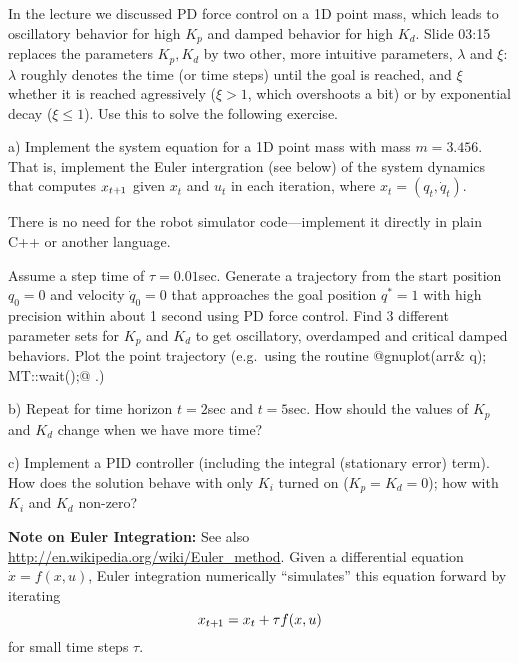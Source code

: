 

\renewcommand{\course}{Robotics}
\renewcommand{\coursepicture}{roboticsLecture}
\renewcommand{\coursedate}{Winter 2014}
\renewcommand{\exnum}{5}

\exercises


\exercisestitle


In the lecture we discussed PD force control on a 1D point mass,
which leads to oscillatory behavior for high $K_p$ and damped behavior
for high $K_d$. Slide 03:15 replaces the parameters
$K_p,K_d$ by two other, more intuitive parameters, $\lambda$ and
$\xi$: $\lambda$ roughly denotes the time (or time steps) until the
goal is reached, and $\xi$ whether it is reached agressively ($\xi>1$,
which overshoots a bit) or by exponential decay ($\xi\le 1$). Use this
to solve the following exercise.


a) Implement the system equation for a 1D point mass with mass
$m=3.456$. That is, implement the Euler intergration (see below) of
the system dynamics that computes $x_{t{{\hspace*{-.0pt}\text{\rm +}\hspace*{-.5pt}}1}}$ given $x_t$ and $u_t$ in
each iteration, where $x_t = (q_t,\dot q_t)$.

There is no need for the robot simulator code---implement it directly
in plain C++ or another language.

Assume a step time of $\tau=0.01$sec. Generate a trajectory from the
start position $q_0=0$ and velocity $\dot q_0=0$ that approaches the
goal position $q^*=1$ with high precision within about 1 second using
PD force control.  Find 3 different parameter sets for $K_p$ and $K_d$
to get oscillatory, overdamped and critical damped behaviors. Plot the
point trajectory (e.g.\ using the routine
%
@gnuplot(arr& q); MT::wait();@ .)

b) Repeat for time horizon $t=2$sec and $t=5$sec. How should the
values of $K_p$ and $K_d$ change when we have more time?

c) Implement a PID controller (including the integral (stationary error)
term). How does the solution behave with only $K_i$ turned on
($K_p=K_d=0$); how with $K_i$ and $K_d$ non-zero?

\textbf{Note on Euler Integration:} See
also \url{http://en.wikipedia.org/wiki/Euler_method}. Given a
differential equation $\dot x = f(x,u)$, Euler integration numerically
``simulates'' this equation forward by iterating
$$x_{t{{\hspace*{-.0pt}\text{\rm +}\hspace*{-.5pt}}1}} = x_t + \tau f(x,u)$$
for small time steps $\tau$.


